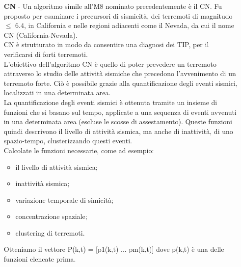\begin{itemize}
L'algoritmo decide di impostare un taglio in base alla completezza del catalogo, ovvero prendere gli eventi di una magnitudo maggiore di una certa x, questo perch\'e i dati registrati sotto quella magnitudo x sono incompleti. Una volta tolti gli eventi che si \`e deciso di scartare prende in considerazione un numero di terremoti, in base ai quali seleziona la magnitudo, ovvero mettiamo che scegliesse 20 come numero, prender\`a l'insieme di magnitudo che produce in media 20 terremoti all'anno, quindi se analizza un intervallo di 30 anni prender\`a 600 terremoti. Infine l'algoritmo calcola con delle funzioni matematiche una stima in TIP basandosi sui terremoti presi in considerazione. \cite{M8Manual}

\item[\textbf{CN} -] Un algoritmo simile all'M8 nominato precedentemente \`e il CN. Fu proposto per esaminare i precursori di sismicit\`a, dei terremoti di magnitudo $\le$ 6.4, in California e nelle regioni adiacenti come il Nevada, da cui il nome CN (California-Nevada).\\
CN \`e strutturato in modo da consentire una diagnosi dei TIP, per il verificarsi di forti terremoti.\\
L'obiettivo dell'algoritmo CN \`e quello di poter prevedere un terremoto attraverso lo studio delle attivit\`a sismiche che precedono l'avvenimento di un terremoto forte. Ci\`o \`e possibile grazie alla quantificazione degli eventi sismici, localizzati in una determinata area.\\
La quantificazione degli eventi sismici \`e ottenuta tramite un insieme di funzioni che si basano sul tempo, applicate a una sequenza di eventi avvenuti in una determinata area (escluse le scosse di assestamento). Queste funzioni quindi descrivono il livello di attivit\`a sismica, ma anche di inattivit\`a, di uno spazio-tempo, clusterizzando questi eventi.\\
Calcolate le funzioni necessarie, come ad esempio:
\begin{itemize}
    \item il livello di attivit\`a sismica;
    \item inattivit\`a sismica;
    \item variazione temporale di simicit\`a;
    \item concentrazione spaziale;
    \item clustering di terremoti.
\end{itemize}
Otteniamo il vettore P(k,t) = [p1(k,t) ... pm(k,t)] dove p(k,t) \`e una delle funzioni elencate prima.\\

\end{itemize}
